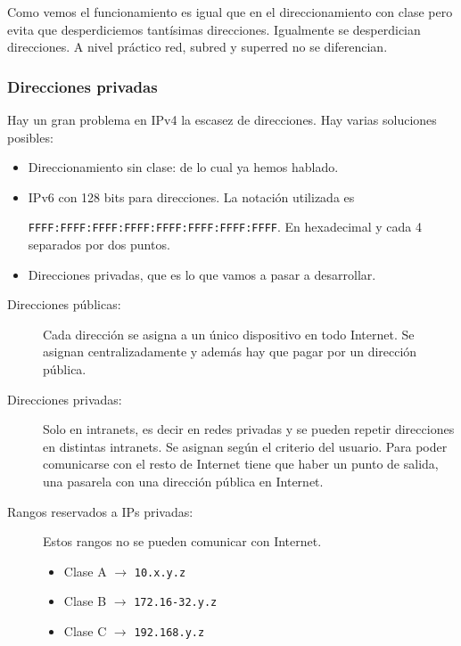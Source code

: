 Como vemos el funcionamiento es igual que en el direccionamiento con clase pero evita que desperdiciemos tantísimas direcciones. Igualmente se desperdician direcciones. A nivel práctico red, subred y superred no se diferencian. 




\subsubsection{Direcciones privadas}

Hay un gran problema en \acrshort{IPv4} la escasez de direcciones. Hay varias soluciones posibles: 
\begin{itemize}
    \item Direccionamiento sin clase: de lo cual ya hemos hablado.
    \item \acrshort{IPv6} con 128 bits para direcciones. La notación utilizada es\

        \verb|FFFF:FFFF:FFFF:FFFF:FFFF:FFFF:FFFF:FFFF|. En hexadecimal y cada 4 separados por dos puntos. 
    \item Direcciones privadas, que es lo que vamos a pasar a desarrollar.
\end{itemize}

\begin{description}
    \item [Direcciones públicas: ] Cada dirección se asigna a un único dispositivo en todo Internet. Se asignan centralizadamente y además hay que pagar por un dirección pública. 
    \item [Direcciones privadas: ] Solo en intranets, es decir en redes privadas y se pueden repetir direcciones en distintas intranets. Se asignan según el criterio del usuario. Para poder comunicarse con el resto de Internet tiene que haber un punto de salida, una pasarela con una dirección pública en Internet. 
    \item [Rangos reservados a IPs privadas:] 
    Estos rangos no se pueden comunicar con Internet.\
    \begin{itemize}
        \item Clase A $\rightarrow$ \verb|10.x.y.z|
        \item Clase B $\rightarrow$ \verb|172.16-32.y.z|
        \item Clase C $\rightarrow$ \verb|192.168.y.z|
    \end{itemize}
\end{description}

